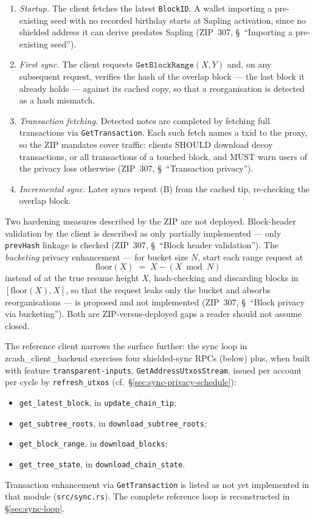 \documentclass[11pt,a4paper]{article}
\theoremstyle{definition}
\begin{document}
\begin{enumerate}[label=(\Alph*)]
\item \emph{Startup.} The client fetches the latest \texttt{BlockID}. A
  wallet importing a pre-existing seed with no recorded birthday starts at
  Sapling activation, since no shielded address it can derive predates
  Sapling (ZIP~307, \S~``Importing a pre-existing seed'').
\item \emph{First sync.} The client requests
  $\mathtt{GetBlockRange}(X, Y)$ and, on any subsequent request, verifies
  the hash of the overlap block --- the last block it already holds ---
  against its cached copy, so that a reorganisation is detected as a hash
  mismatch.
\item \emph{Transaction fetching.} Detected notes are completed by
  fetching full transactions via \texttt{GetTransaction}. Each such fetch
  names a txid to the proxy, so the ZIP mandates cover traffic: clients
  SHOULD download decoy transactions, or all transactions of a touched
  block, and MUST warn users of the privacy loss otherwise (ZIP~307,
  \S~``Transaction privacy'').
\item \emph{Incremental sync.} Later syncs repeat (B) from the cached
  tip, re-checking the overlap block.
\end{enumerate}

Two hardening measures described by the ZIP are not deployed. Block-header
validation by the client is described as only partially implemented ---
only \texttt{prevHash} linkage is checked (ZIP~307, \S~``Block header
validation''). The \emph{bucketing} privacy enhancement --- for bucket
size $N$, start each range request at
\[
\mathrm{floor}(X) \;=\; X - (X \bmod N)
\]
instead of at the true resume height $X$, hash-checking and discarding
blocks in $[\mathrm{floor}(X), X]$, so that the request leaks only the
bucket and absorbs reorganisations --- is proposed and not implemented
(ZIP~307, \S~``Block privacy via bucketing''). Both are ZIP-versus-deployed
gaps a reader should not assume closed.

The reference client narrows the surface further: the sync loop in
\textsf{zcash\_client\_backend}
exercises four shielded-sync RPCs
(below) plus, when built with feature \texttt{transparent-inputs},
\texttt{GetAddressUtxosStream}, issued per account per cycle by
\texttt{refresh\_utxos} (cf.\
\S\ref{sec:sync-privacy-schedule}):
\begin{itemize}
\item \texttt{get\_latest\_block}, in \texttt{update\_chain\_tip};
\item \texttt{get\_subtree\_roots}, in \texttt{download\_subtree\_roots};
\item \texttt{get\_block\_range}, in \texttt{download\_blocks};
\item \texttt{get\_tree\_state}, in \texttt{download\_chain\_state}.
\end{itemize}
Transaction enhancement via \texttt{GetTransaction} is listed as not yet
implemented in that module (\texttt{src/sync.rs}). The complete reference
loop is reconstructed in \S\ref{sec:sync-loop}.
\end{document}
